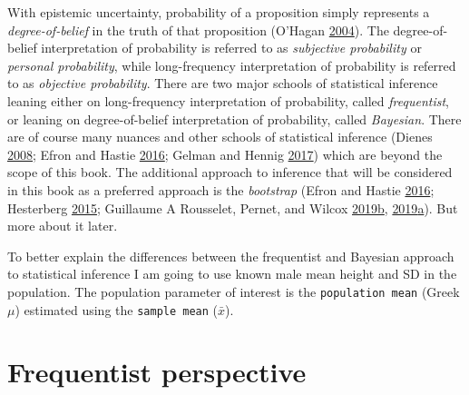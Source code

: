 \documentclass[
]{book}
\begin{document}
With epistemic uncertainty, probability of a proposition simply represents a \emph{degree-of-belief} in the truth of that proposition (O'Hagan \protect\hyperlink{ref-ohaganDicingUnknown2004}{2004}). The degree-of-belief interpretation of probability is referred to as \emph{subjective probability} or \emph{personal probability}, while long-frequency interpretation of probability is referred to as \emph{objective probability}. There are two major schools of statistical inference leaning either on long-frequency interpretation of probability, called \emph{frequentist}, or leaning on degree-of-belief interpretation of probability, called \emph{Bayesian}. There are of course many nuances and other schools of statistical inference (Dienes \protect\hyperlink{ref-dienesUnderstandingPsychologyScience2008}{2008}; Efron and Hastie \protect\hyperlink{ref-efronComputerAgeStatistical2016}{2016}; Gelman and Hennig \protect\hyperlink{ref-gelmanSubjectiveObjectiveStatistics2017}{2017}) which are beyond the scope of this book. The additional approach to inference that will be considered in this book as a preferred approach is the \emph{bootstrap} (Efron and Hastie \protect\hyperlink{ref-efronComputerAgeStatistical2016}{2016}; Hesterberg \protect\hyperlink{ref-hesterbergWhatTeachersShould2015}{2015}; Guillaume A Rousselet, Pernet, and Wilcox \protect\hyperlink{ref-rousseletPercentileBootstrapTeaser2019}{2019}\protect\hyperlink{ref-rousseletPercentileBootstrapTeaser2019}{b}, \protect\hyperlink{ref-rousseletPracticalIntroductionBootstrap2019}{2019}\protect\hyperlink{ref-rousseletPracticalIntroductionBootstrap2019}{a}). But more about it later.

To better explain the differences between the frequentist and Bayesian approach to statistical inference I am going to use known male mean height and SD in the population. The population parameter of interest is the \texttt{population\ mean} (Greek \(\mu\)) estimated using the \texttt{sample\ mean} (\(\bar{x}\)).

\hypertarget{frequentist-perspective}{%
\chapter{Frequentist perspective}\label{frequentist-perspective}}
\end{document}
